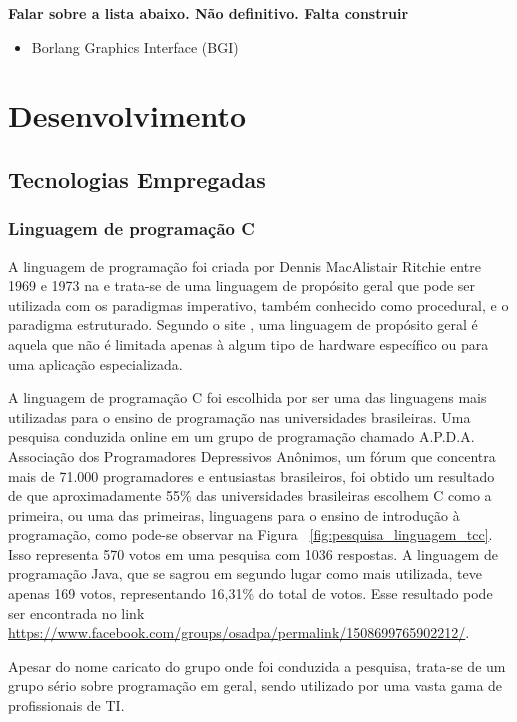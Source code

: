 \documentclass[12pt, %
openright,
oneside, %
a4paper,    %
brazil]{facom-ufu-abntex2}
\begin{document}
\textbf{Falar sobre a lista abaixo. Não definitivo. Falta construir}
\begin{itemize}
    \item Borlang Graphics Interface (BGI)
\end{itemize}

\chapter{Desenvolvimento}

\section{Tecnologias Empregadas}

\subsection{Linguagem de programação C}
A linguagem de programação  foi criada por Dennis MacAlistair Ritchie entre 1969 e 1973 na  e trata-se de uma linguagem de propósito geral que pode ser utilizada com os paradigmas imperativo, também conhecido como procedural, e o paradigma estruturado. Segundo o site , uma linguagem de propósito geral é aquela que não é limitada apenas à algum tipo de hardware específico ou para uma aplicação especializada.

A linguagem de programação C foi escolhida por ser uma das linguagens mais utilizadas para o ensino de programação nas universidades brasileiras. Uma pesquisa conduzida online em um grupo de programação chamado A.P.D.A. Associação dos Programadores Depressivos Anônimos, um fórum que concentra mais de 71.000 programadores e entusiastas brasileiros, foi obtido um resultado de que aproximadamente 55\% das universidades brasileiras escolhem C como a primeira, ou uma das primeiras, linguagens para o ensino de introdução à programação, como pode-se observar na Figura ~\ref{fig:pesquisa_linguagem_tcc}. Isso representa 570 votos em uma pesquisa com 1036 respostas. A linguagem de programação Java, que se sagrou em segundo lugar como mais utilizada, teve apenas 169 votos, representando 16,31\% do total de votos. Esse resultado pode ser encontrada no link \hyperref[https://www.facebook.com/groups/osadpa/permalink/1508699765902212/]{https://www.facebook.com/groups/osadpa/permalink/1508699765902212/}.

Apesar do nome caricato do grupo onde foi conduzida a pesquisa, trata-se de um grupo sério sobre programação em geral, sendo utilizado por uma vasta gama de profissionais de TI.
\end{document}

